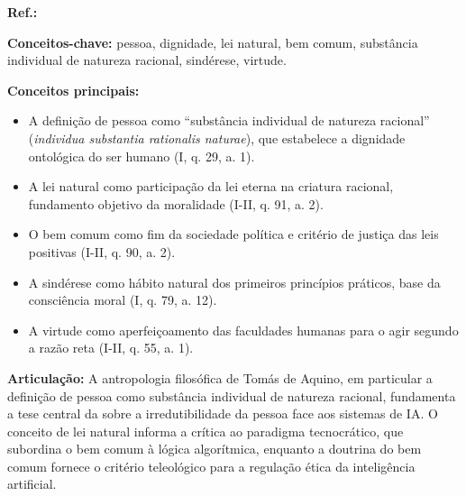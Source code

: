 \begin{fichamento}
    \textbf{Ref.:} \cite{AquinoST}
    
    \textbf{Conceitos-chave:} pessoa, dignidade, lei natural, bem comum, substância individual de natureza racional, sindérese, virtude.
    
    \textbf{Conceitos principais:}
    \begin{itemize}
        \item A definição de pessoa como ``substância individual de natureza racional'' (\textit{individua substantia rationalis naturae}), que estabelece a dignidade ontológica do ser humano (I, q. 29, a. 1).
        \item A lei natural como participação da lei eterna na criatura racional, fundamento objetivo da moralidade (I-II, q. 91, a. 2).
        \item O bem comum como fim da sociedade política e critério de justiça das leis positivas (I-II, q. 90, a. 2).
        \item A sindérese como hábito natural dos primeiros princípios práticos, base da consciência moral (I, q. 79, a. 12).
        \item A virtude como aperfeiçoamento das faculdades humanas para o agir segundo a razão reta (I-II, q. 55, a. 1).
    \end{itemize}
    
    \textbf{Articulação:} A antropologia filosófica de Tomás de Aquino, em particular a definição de pessoa como substância individual de natureza racional, fundamenta a tese central da \MH{} sobre a irredutibilidade da pessoa face aos sistemas de IA. O conceito de lei natural informa a crítica ao paradigma tecnocrático, que subordina o bem comum à lógica algorítmica, enquanto a doutrina do bem comum fornece o critério teleológico para a regulação ética da inteligência artificial.
\end{fichamento}


